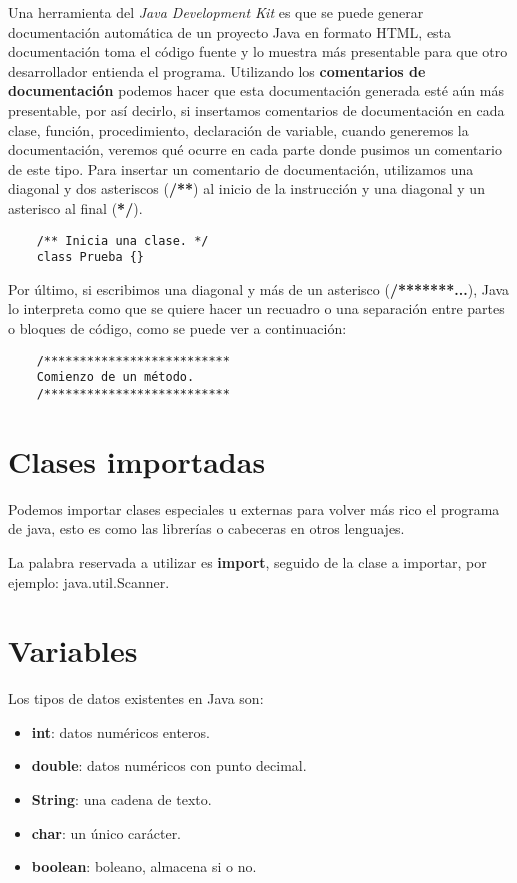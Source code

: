 Una herramienta del \textit{Java Development Kit} es que se puede generar documentación automática de un proyecto Java en formato HTML, esta documentación toma el código fuente y lo muestra más presentable para que otro desarrollador entienda el programa. Utilizando los \textbf{comentarios de documentación} podemos hacer que esta documentación generada esté aún más presentable, por así decirlo, si insertamos comentarios de documentación en cada clase, función, procedimiento, declaración de variable, cuando generemos la documentación, veremos qué ocurre en cada parte donde pusimos un comentario de este tipo. Para insertar un comentario de documentación, utilizamos una diagonal y dos asteriscos (\textbf{/**}) al inicio de la instrucción y una diagonal y un asterisco al final (\textbf{*/}).
\begin{lstlisting}
    /** Inicia una clase. */
    class Prueba {}
\end{lstlisting}

Por último, si escribimos una diagonal y más de un asterisco (\textbf{/*******...}), Java lo interpreta como que se quiere hacer un recuadro o una separación entre partes o bloques de código, como se puede ver a continuación:
\begin{lstlisting}
    /**************************
    Comienzo de un método.
    /**************************
\end{lstlisting}



\section{Clases importadas}

Podemos importar clases especiales u externas para volver más rico el programa de java, esto es como las librerías o cabeceras en otros lenguajes.

La palabra reservada a utilizar es \textbf{import}, seguido de la clase a importar, por ejemplo: java.util.Scanner.



\section{Variables}

Los tipos de datos existentes en Java son:
\begin{itemize}
    \item \textbf{int}: datos numéricos enteros.
    \item \textbf{double}: datos numéricos con punto decimal.
    \item \textbf{String}: una cadena de texto.
    \item \textbf{char}: un único carácter.
    \item \textbf{boolean}: boleano, almacena si o no.
\end{itemize}

